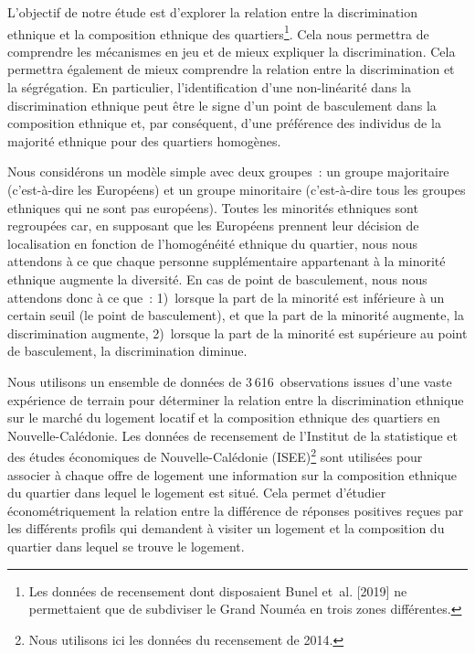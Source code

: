 \documentclass[10pt]{Revue-economique} %
\begin{document}
L’objectif de notre étude est d’explorer la relation entre la discrimination ethnique et la composition ethnique des quartiers\footnote{Les données de recensement dont disposaient Bunel et al. [2019] ne permettaient que de subdiviser le Grand Nouméa en trois zones différentes.}. Cela nous permettra de comprendre les mécanismes en jeu et de mieux expliquer la discrimination. Cela permettra également de mieux comprendre la relation entre la discrimination et la ségrégation. En particulier, l’identification d’une non-linéarité dans la discrimination ethnique peut être le signe d’un point de basculement dans la composition ethnique et, par conséquent, d’une préférence des individus de la majorité ethnique pour des quartiers homogènes.

Nous considérons un modèle simple avec deux groupes : un groupe majoritaire (c’est-à-dire les Européens) et un groupe minoritaire (c’est-à-dire tous les groupes ethniques qui ne sont pas européens). Toutes les minorités ethniques sont regroupées car, en supposant que les Européens prennent leur décision de localisation en fonction de l’homogénéité ethnique du quartier, nous nous attendons à ce que chaque personne supplémentaire appartenant à la minorité ethnique augmente la diversité. En cas de point de basculement, nous nous attendons donc à ce que : 1) lorsque la part de la minorité est inférieure à un certain seuil (le point de basculement), et que la part de la minorité augmente, la discrimination augmente, 2) lorsque la part de la minorité est supérieure au point de basculement, la discrimination diminue.

Nous utilisons un ensemble de données de 3 616 observations issues d’une vaste expérience de terrain pour déterminer la relation entre la discrimination ethnique sur le marché du logement locatif et la composition ethnique des quartiers en Nouvelle-Calédonie. Les données de recensement de l’Institut de la statistique et des études économiques de Nouvelle-Calédonie (ISEE)\footnote{Nous utilisons ici les données du recensement de 2014.} sont utilisées pour associer à chaque offre de logement une information sur la composition ethnique du quartier dans lequel le logement est situé. Cela permet d’étudier économétriquement la relation entre la différence de réponses positives reçues par les différents profils qui demandent à visiter un logement et la composition du quartier dans lequel se trouve le logement.
\end{document}
